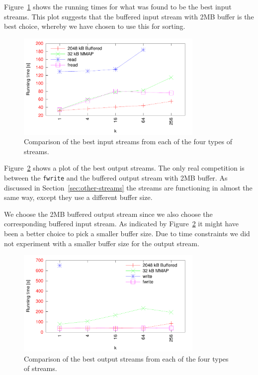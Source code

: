 \documentclass[a4paper,12pt]{article}
\begin{document}
Figure~\ref{fig:best-input} shows the running times for what was found
to be the best input streams. This plot suggests that the buffered
input stream with 2MB buffer is the best choice, whereby we have
chosen to use this for sorting.

\begin{figure}[h!]
  \centering
  \includegraphics[width=0.8\textwidth]{best_input}
  \caption{Comparison of the best input streams from each of the four
    types of streams.}
  \label{fig:best-input}
\end{figure}

Figure~\ref{fig:best-output} shows a plot of the best output
streams. The only real competition is between the \texttt{fwrite} and
the buffered output stream with 2MB buffer. As discussed in
Section~\ref{sec:other-streams} the streams are functioning in almost
the same way, except they use a different buffer size.

We choose the 2MB buffered output stream since we also choose the corresponding buffered input stream. As indicated by Figure~\ref{fig:best-output} it might have been a better choice to pick a smaller buffer size. Due to time constraints we did not experiment with a smaller buffer size for the output stream.

\begin{figure}[h!]
  \centering
  \includegraphics[width=0.8\textwidth]{best_output}
  \caption{Comparison of the best output streams from each of the four
    types of streams.}
  \label{fig:best-output}
\end{figure}
\end{document}
